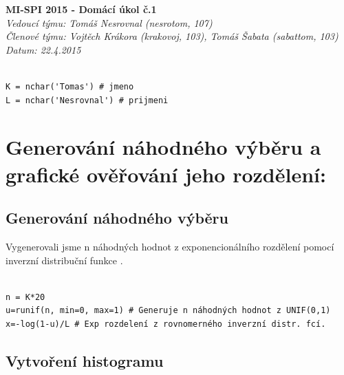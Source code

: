 \documentclass[12pt]{article}
\begin{document}
\sffamily\fontsize{26}{15}\color{MSBlue}\textbf{MI-SPI 2015 - Domácí úkol č.1}\\
\color{MSBlue}\underline{\hspace{17cm}}
\sffamily\fontsize{12}{15}\color{MSBlue}\textit{Vedoucí týmu: Tomáš Nesrovnal (nesrotom, 107)}\\
\sffamily\fontsize{12}{15}\color{MSBlue}\textit{Členové týmu: Vojtěch Krákora (krakovoj, 103), Tomáš Šabata (sabattom, 103)}\\
\sffamily\fontsize{12}{15}\color{MSBlue}\textit{Datum: 22.4.2015}\\
  \begin{lstlisting}[frame=single]  % Start your code-block

K = nchar('Tomas') # jmeno
L = nchar('Nesrovnal') # prijmeni
\end{lstlisting}
\section{Generování náhodného výběru a grafické ověřování jeho rozdělení:}
\subsection{Generování náhodného výběru}
Vygenerovali jsme n náhodných hodnot z exponencionálního rozdělení pomocí inverzní distribuční funkce \cite{wiki}.
  \begin{lstlisting}[frame=single]  % Start your code-block
  
n = K*20
u=runif(n, min=0, max=1) # Generuje n náhodných hodnot z UNIF(0,1)
x=-log(1-u)/L # Exp rozdelení z rovnomerného inverzní distr. fcí.
\end{lstlisting}
\subsection{Vytvoření histogramu}
\end{document}
